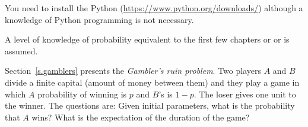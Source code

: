 You need to install the Python (\url{https://www.python.org/downloads/}) although a knowledge of Python programming is not necessary.

A level of knowledge of probability equivalent to the first few chapters or \cite{BW} or \cite{ross} is assumed.

Section~\ref{s.gamblers} presents the \emph{Gambler's ruin problem}. Two players $A$ and $B$ divide a finite capital (amount of money between them) and they play a game in which $A$ probability of winning is $p$ and $B$'s is $1-p$. The loser gives one unit to the winner. The questions are: Given initial parameters, what is the probability that $A$ wins? What is the expectation of the duration of the game?

